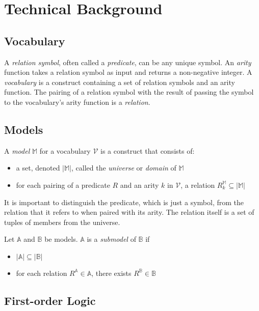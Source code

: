 \section{Technical Background}
\label{sec:technical_background}

	\subsection{Vocabulary}

		A \emph{relation symbol}, often called a \emph{predicate}, can be any
		unique symbol. An \emph{arity} function takes a relation symbol as
		input and returns a non-negative integer. A \emph{vocabulary} is a
		construct containing a set of relation symbols and an arity function.
		The pairing of a relation symbol with the result of passing the symbol
		to the vocabulary's arity function is a \emph{relation}.

	\subsection{Models}

		A \emph{model} $\mathbb{M}$ for a vocabulary $\mathcal{V}$ is a construct that consists of:
		\begin{itemize}
		\item a set, denoted $|\mathbb{M}|$, called the \emph{universe} or \emph{domain} of $\mathbb{M}$
		\item for each pairing of a predicate $R$ and an arity $k$ in $\mathcal{V}$, a relation $R^\mathbb{M}_k \subseteq |\mathbb{M}|$
		\end{itemize}
		It is important to distinguish the predicate, which is just a symbol,
		from the relation that it refers to when paired with its arity. The
		relation itself is a set of tuples of members from the universe.

		\begin{definition}
			Let $\mathbb{A}$ and $\mathbb{B}$ be models. $\mathbb{A}$ is a
			\emph{submodel} of $\mathbb{B}$ if
			\begin{itemize}
			\item $|\mathbb{A}| \subseteq |\mathbb{B}|$
			\item for each relation $R^\mathbb{A} \in \mathbb{A}$, there exists $R^\mathbb{B} \in \mathbb{B}$
			\end{itemize}
		\end{definition}

	\subsection{First-order Logic}

